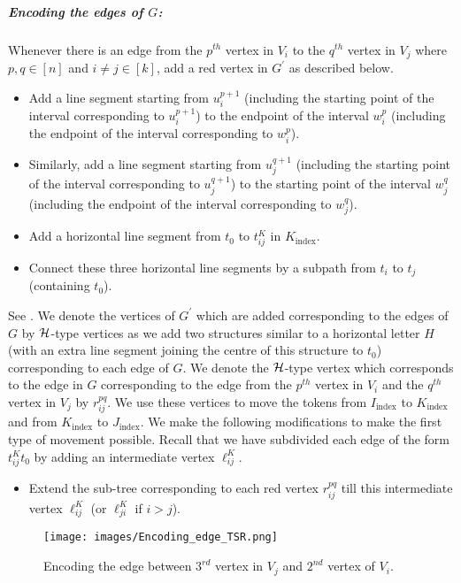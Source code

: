 \subparagraph*{Encoding the edges of $G$:}
Whenever there is an edge from the $p^{th}$ vertex in $V_i$ to the
$q^{th}$ vertex in $V_j$ where $p, q\in[n]$ and $i\neq j\in [k]$,
add a red vertex in $G^\prime$ as described below.
\begin{itemize}
\item Add a line segment starting from $u_i^{p+1}$
(including the starting point of the interval corresponding to $u_i^{p+1}$)
to the endpoint of the interval $w_i^p$
(including the endpoint of the interval corresponding to $w_i^p$).
\item Similarly, add a line segment starting from $u_j^{q+1}$
(including the starting point of the interval corresponding to $u_j^{q+1}$)
to the starting point of the interval $w_j^q$
(including the endpoint of the interval corresponding to $w_j^q$).
\item Add a horizontal line segment from $t_0$ to $t_{ij}^K$
in $K_{\text{index}}$.
\item Connect these three horizontal line segments by
a subpath from $t_i$ to $t_j$ (containing $t_0$).
\end{itemize}
See .
We denote the vertices of $G^\prime$ which are added corresponding
to the edges of $G$ by ${\mathcal H}$-type vertices as we add two structures
similar to a horizontal letter $H$ (with an extra line segment joining the
centre of this structure to $t_0$) corresponding to each edge of $G$.
We denote the ${\mathcal H}$-type vertex which corresponds to the edge in $G$
corresponding to the edge from the $p^{th}$ vertex in $V_i$ and
the $q^{th}$ vertex in $V_j$ by $r_{ij}^{pq}$.
We use these vertices to move the tokens from $I_{\text{index}}$
to $K_{\text{index}}$ and from $K_{\text{index}}$ to $J_{\text{index}}$.
We make the following modifications to make the first type of movement possible.
Recall that we have subdivided each edge of the
form $t^K_{ij}t_0$ by adding an intermediate vertex $\ell^K_{ij}$.
\begin{itemize}
\item
Extend the sub-tree corresponding to each red vertex
$r^{pq}_{ij}$ till this intermediate vertex
$\ell^K_{ij}$ (or $\ell^K_{ji}$ if $i>j$).
\end{itemize}

\begin{figure}
\centering
\texttt{[image: images/Encoding\_edge\_TSR.png]}
\caption{Encoding the edge between $3^{rd}$ vertex in $V_j$ and $2^{nd}$ vertex of $V_i$.}
\label{Encoding_edge_TSR}
\vspace{-5mm}
\end{figure}

